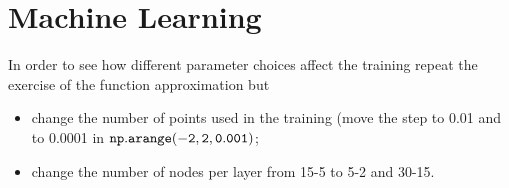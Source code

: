 \chapter{Machine Learning}\label{ex-lesson-15}

\begin{Exercise}
In order to see how different parameter choices affect the training
repeat the exercise of the function approximation but

\begin{itemize}
\tightlist
\item
  change the number of points used in the training (move the step
  to 0.01 and to 0.0001 in \(\tt{np.arange(-2, 2, 0.001)}\);
\item
  change the number of nodes per layer from 15-5 to 5-2 and 30-15.
\end{itemize}
\end{Exercise}

